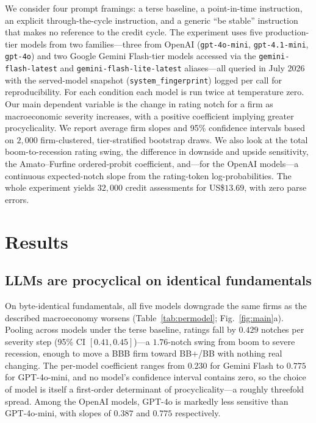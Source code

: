 \documentclass[a4paper,fleqn]{cas-sc}
\begin{document}
We consider four prompt framings: a terse baseline, a point-in-time instruction, an explicit
through-the-cycle instruction, and a generic ``be stable'' instruction that makes no reference to the
credit cycle. The experiment uses five production-tier models from two families---three from OpenAI
(\texttt{gpt-4o-mini}, \texttt{gpt-4.1-mini}, \texttt{gpt-4o}) and two Google Gemini Flash-tier models
accessed via the \texttt{gemini-flash-latest} and \texttt{gemini-flash-lite-latest} aliases---all
queried in July 2026 with the served-model snapshot (\texttt{system\_fingerprint}) logged per call for
reproducibility. For each condition each model is run twice at temperature zero. Our main dependent
variable is the change in rating notch for a firm as macroeconomic severity increases, with a positive
coefficient implying greater procyclicality. We report average firm slopes and 95\% confidence
intervals based on $2{,}000$ firm-clustered, tier-stratified bootstrap draws. We also look at the total
boom-to-recession rating swing, the difference in downside and upside sensitivity, the Amato--Furfine
ordered-probit coefficient, and---for the OpenAI models---a continuous expected-notch slope from the
rating-token log-probabilities. The whole experiment yields $32{,}000$ credit assessments for
US\$$13.69$, with zero parse errors.

\section{Results}\label{sec:results}
\subsection{LLMs are procyclical on identical fundamentals}\label{sec:pro}
On byte-identical fundamentals, all five models downgrade the same firms as the described macroeconomy
worsens (Table~\ref{tab:permodel}; Fig.~\ref{fig:main}a). Pooling across models under the terse
baseline, ratings fall by $0.429$ notches per severity step (95\% CI $[0.41,0.45]$)---a $1.76$-notch
swing from boom to severe recession, enough to move a BBB firm toward BB$+$/BB with nothing real
changing. The per-model coefficient ranges from $0.230$ for Gemini Flash to $0.775$ for GPT-4o-mini,
and no model's confidence interval contains zero, so the choice of model is itself a first-order
determinant of procyclicality---a roughly threefold spread. Among the OpenAI models, GPT-4o is
markedly less sensitive than GPT-4o-mini, with slopes of $0.387$ and $0.775$ respectively.
\end{document}
